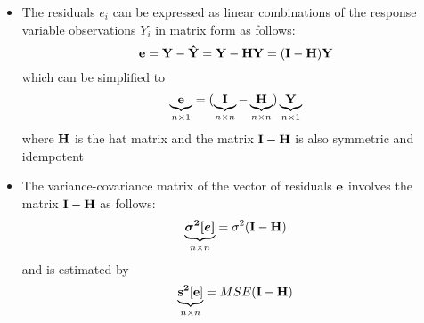 \begin{itemize}
\item The residuals $e_i$ can be expressed as linear combinations of the response variable observations $Y_i$ in matrix form as follows: $$ \mathbf{e} = \mathbf{Y} - \mathbf{\hat{Y}} = \mathbf{Y} - \mathbf{HY} = (\mathbf{I} - \mathbf{H})\mathbf{Y} $$ which can be simplified to $$ \underbrace{\mathbf{e}}_{n \times 1} = (\underbrace{\mathbf{I}}_{n \times n} - \underbrace{\mathbf{H}}_{n \times n}) \underbrace{\mathbf{Y}}_{n \times 1} $$ where $\mathbf{H}$ is the hat matrix and the matrix $\mathbf{I} - \mathbf{H}$ is also symmetric and idempotent 
\item The variance-covariance matrix of the vector of residuals $\mathbf{e}$ involves the matrix $\mathbf{I} - \mathbf{H}$ as follows: $$ \underbrace{\bm{\sigma^2[e]}}_{n \times n} = \sigma^2(\mathbf{I} - \mathbf{H}) $$ and is estimated by $$ \underbrace{\mathbf{s^2[e]}}_{n \times n} = MSE(\mathbf{I} - \mathbf{H}) $$ 
\end{itemize} 

